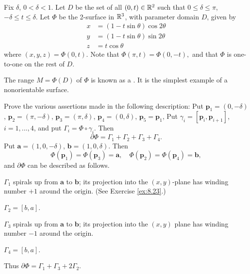 \begin{myexercise}
    \label{ex:10.32}
    Fix $\delta$, $0 < \delta < 1$.
    Let $D$ be the set of all $(0, t) \in {\protect\mathbb R}^2$ such that $0 \leq \delta \leq \pi$, $-\delta \leq t \leq \delta$.
    Let $\Phi$ be the 2-surface in ${\protect\mathbb R}^3$, with parameter domain $D$, given by
    \begin{align*}
        x & = (1-t \sin \theta) \cos 2 \theta \\
        y & = (1-t \sin \theta) \sin 2 \theta \\
        z & = t \cos \theta
    \end{align*}
    where $(x, y, z) = \Phi(0, t)$.
    Note that $\Phi(\pi, t) = \Phi(0, - t),$
    and that $\Phi$ is one-to-one on the rest of $D$.

    The range $M = \Phi(D)$ of $\Phi$ is known as a .
    It is the simplest example of a nonorientable surface.

    Prove the various assertions made in the following description:
    Put
    $\mathbf{p}_1 = (0   , -\delta)$,
    $\mathbf{p}_2 = (\pi , -\delta)$,
    $\mathbf{p}_3 = (\pi ,  \delta)$,
    $\mathbf{p}_4 = (0   ,  \delta)$,
    $\mathbf{p}_5 = \mathbf{p}_1$,
    Put $\gamma_i =[\mathbf{p}_{i}, \mathbf{p}_{i+1}]$,
    $i = 1, ... , 4$, and put $\Gamma_i = \Phi \circ \gamma_i$.
    Then
    \begin{equation*}
        \partial \Phi =
        \Gamma_1 +
        \Gamma_2 +
        \Gamma_3 +
        \Gamma_4 .
    \end{equation*}
    Put $\mathbf{a} = (1, 0, -\delta)$, $\mathbf{b} = (1, 0, \delta)$.
    Then
    \begin{equation*}
        \Phi(\mathbf{p}_1) = \Phi(\mathbf{p}_3) = \mathbf{a}, \quad
        \Phi(\mathbf{p}_2) = \Phi(\mathbf{p}_4) = \mathbf{b},
    \end{equation*}
    and $\partial\Phi$ can be described as follows.

    $\Gamma_1$ spirals up from $\mathbf{a}$ to $\mathbf{b}$;
    its projection into the $(x, y)$-plane has winding number $+1$ around the origin. (See Exercise \ref{ex:8.23}.)

    $\Gamma_2 = [b, a]$.

    $\Gamma_3$ spirals up from $\mathbf{a}$ to $\mathbf{b}$;
    its projection into the $(x, y)$ plane has winding number $-1$ around the origin.

    $\Gamma_4 = [b, a]$.

    Thus $\partial\Phi =  \Gamma_1 +  \Gamma_3 + 2 \Gamma_2$.


\end{myexercise}
